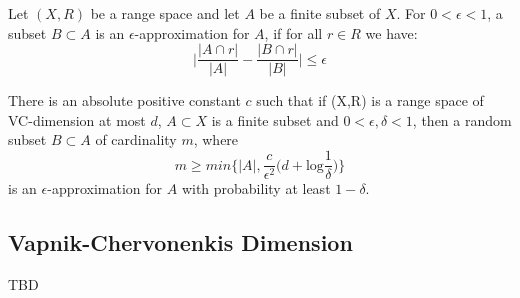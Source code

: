 \begin{definition}
Let $(X,R)$ be a range space and let $A$ be a finite subset of $X$. For $0<\epsilon<1$, a subset $B\subset A$ is an $\epsilon$-approximation for $A$, if for all $r\in R$ we have:
\begin{displaymath}
\big| \frac{|A\cap r|}{|A|}-\frac{|B\cap r|}{|B|}\big|\leq \epsilon
\end{displaymath}
\end{definition}

\begin{theorem}
There is an absolute positive constant $c$ such that if (X,R) is a range space of VC-dimension at most $d$, $A\subset X$ is a finite subset and $0<\epsilon,\delta<1$, then a random subset $B\subset A$ of cardinality $m$, where
\begin{displaymath}
m\geq min\Big\{|A|,\frac{c}{\epsilon^2}\Big(d+\mbox{log}\frac{1}{\delta}\Big)\Big\}
\end{displaymath}
is an $\epsilon$-approximation for $A$ with probability at least $1-\delta$.
\end{theorem}


\subsection{Vapnik-Chervonenkis Dimension}\label{sec:vcdim}
\XXX TBD

